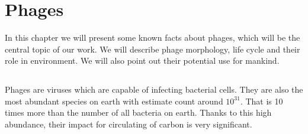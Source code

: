 \chapter{Phages}

In this chapter we will present some known facts about phages, which will be the central topic of our work. We will
describe phage morphology, life cycle and their role in environment. We will also point out their potential use for
mankind.

\section{}
Phages are viruses which are capable of infecting bacterial cells. They are also the most abundant species on earth
with estimate count around $10^{31}$. That is 10 times more than the number of all bacteria on earth. Thanks to this
high abundance, their impact for circulating of carbon is very significant.
